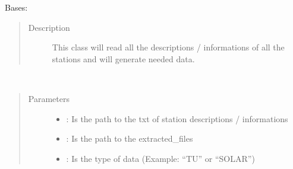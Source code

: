 \documentclass[letterpaper,10pt,english]{sphinxmanual}
\begin{document}
\begin{fulllineitems}
\label{\detokenize{DwdDataPrep:DwdDataPrep.Reader}}
\sphinxAtStartPar
Bases: 
\begin{quote}\begin{description}
\item[{Description}] \leavevmode
\sphinxAtStartPar
This class will read all the descriptions / informations of all the stations and will generate needed data.

\end{description}\end{quote}

\begin{fulllineitems}
\label{\detokenize{DwdDataPrep:DwdDataPrep.Reader.__init__}}~\begin{quote}\begin{description}
\item[{Parameters}] \leavevmode\begin{itemize}
\item {} 
\sphinxAtStartPar
{} \textendash{} : Is the path to the txt of station descriptions / informations

\item {} 
\sphinxAtStartPar
{} \textendash{} : Is the path to the extracted\_files

\item {} 
\sphinxAtStartPar
{} \textendash{} : Is the type of data (Example: “TU” or “SOLAR”)

\end{itemize}

\end{description}\end{quote}


\end{fulllineitems}
\end{fulllineitems}
\end{document}
